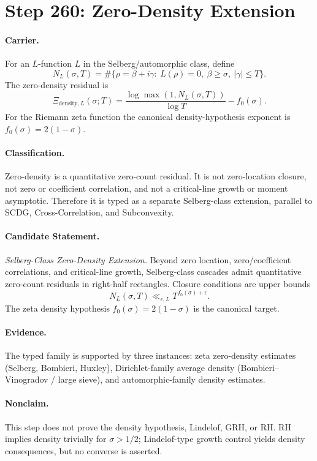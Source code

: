 \section*{Step 260: Zero-Density Extension}

\paragraph{Carrier.}
For an $L$-function $L$ in the Selberg/automorphic class, define
\[
N_L(\sigma,T)=\#\{\rho=\beta+i\gamma:\ L(\rho)=0,\ \beta\geq \sigma,\ |\gamma|\leq T\}.
\]
The zero-density residual is
\[
\Xi_{\mathrm{density},L}(\sigma;T)
  = \frac{\log \max(1,N_L(\sigma,T))}{\log T}-f_0(\sigma).
\]
For the Riemann zeta function the canonical density-hypothesis exponent is
$f_0(\sigma)=2(1-\sigma)$.

\paragraph{Classification.}
Zero-density is a quantitative zero-count residual.  It is not zero-location
closure, not zero or coefficient correlation, and not a critical-line growth or
moment asymptotic.  Therefore it is typed as a separate Selberg-class extension,
parallel to SCDG, Cross-Correlation, and Subconvexity.

\paragraph{Candidate Statement.}
\emph{Selberg-Class Zero-Density Extension.} Beyond zero location,
zero/coefficient correlations, and critical-line growth, Selberg-class cascades
admit quantitative zero-count residuals in right-half rectangles.  Closure
conditions are upper bounds
\[
N_L(\sigma,T)\ll_{\epsilon,L}T^{f_0(\sigma)+\epsilon}.
\]
The zeta density hypothesis $f_0(\sigma)=2(1-\sigma)$ is the canonical target.

\paragraph{Evidence.}
The typed family is supported by three instances: zeta zero-density estimates
(Selberg, Bombieri, Huxley), Dirichlet-family average density
(Bombieri--Vinogradov / large sieve), and automorphic-family density estimates.

\paragraph{Nonclaim.}
This step does not prove the density hypothesis, Lindelof, GRH, or RH.  RH
implies density trivially for $\sigma>1/2$; Lindelof-type growth control yields
density consequences, but no converse is asserted.
